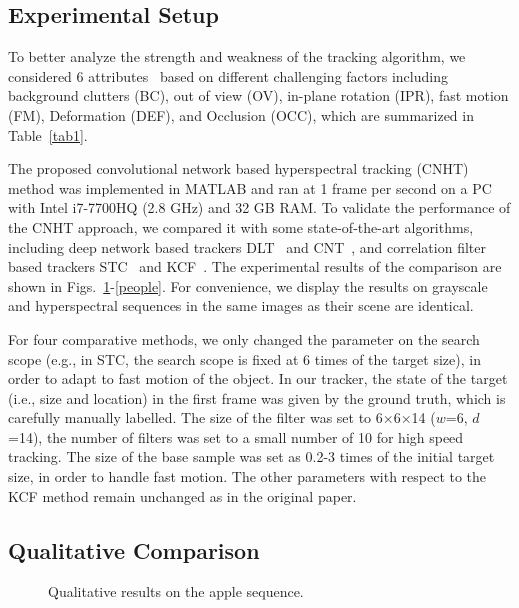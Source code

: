 \documentclass[runningheads,a4paper]{llncs}
\begin{document}
\subsection{Experimental Setup}
To better analyze the strength and weakness of the tracking algorithm, we considered 6 attributes~\cite{VOT} based on different challenging factors including background clutters (BC), out of view (OV), in-plane rotation (IPR), fast motion (FM), Deformation (DEF), and Occlusion (OCC), which are summarized in Table~\ref{tab1}.

The proposed convolutional network based hyperspectral tracking (CNHT) method was implemented in MATLAB and ran at 1 frame per second on a PC with Intel i7-7700HQ (2.8 GHz) and 32 GB RAM. To validate the performance of the CNHT approach, we compared it with some state-of-the-art algorithms, including deep network based trackers DLT~\cite{DLT} and CNT~\cite{CNT}, and correlation filter based trackers STC~\cite{STC} and KCF~\cite{KCF}. The experimental results of the comparison are shown in Figs.~\ref{apple}-\ref{people}. For convenience, we display the results on grayscale and hyperspectral sequences in the same images as their scene are identical.

For four comparative methods, we only changed the parameter on the search scope (e.g., in STC, the search scope is fixed at 6 times of the target size), in order to adapt to fast motion of the object. In our tracker, the state of the target (i.e., size and location) in the first frame was given by the ground truth, which is carefully manually labelled. The size of the filter was set to 6$\times$6$\times$14 ($w$=6, $d$=14), the number of filters was set to a small number of 10 for high speed tracking. The size of the base sample was set as 0.2-3 times of the initial target size, in order to handle fast motion. The other parameters with respect to the KCF method remain unchanged as in the original paper.

\subsection{Qualitative Comparison}
\begin{figure}[htb!]
\centering
     \caption{Qualitative results on the apple sequence.}\label{apple}
\end{figure}
\end{document}
